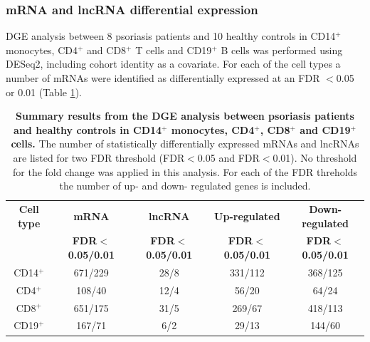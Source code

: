 \subsubsection{mRNA and lncRNA differential expression}

DGE analysis between 8 psoriasis patients and 10 healthy controls in CD14$^+$ monocytes, CD4$^+$ and CD8$^+$ T cells and CD19$^+$ B cells was performed using DESeq2, including cohort identity as a covariate. For each of the cell types a number of mRNAs were identified as differentially expressed at an FDR $<$0.05 or 0.01 (Table \ref{tab:RNAseq_PS_CTL_differential_analysis_results}).  

\begin{table}[htbp]
\centering
\begin{tabular}{@{} c c c c c}
\toprule
\textbf{Cell type}   & \textbf{mRNA}            & \textbf{lncRNA}           & \textbf{Up-regulated}        & \textbf{Down-regulated}\\
                     & \textbf{FDR$<$0.05/0.01} & \textbf{FDR$<$0.05/0.01}  & \textbf{FDR$<$0.05/0.01}    & \textbf{FDR$<$0.05/0.01}\\
	
										
\midrule
\midrule
CD14$^+$             & 671/229                  & 28/8                    & 331/112                       &368/125\\               
CD4$^+$              & 108/40                   & 12/4                    & 56/20                         &64/24 \\
CD8$^+$              & 651/175                  & 31/5                    & 269/67                        &418/113 \\
CD19$^+$             & 167/71                   & 6/2                     & 29/13                         &144/60\\
\bottomrule 
\end{tabular}
\medskip %
\caption[Summary results from the DGE analysis between psoriasis patients and healthy controls in CD14$^+$ monocytes, CD4$^+$, CD8$^+$ and CD19$^+$ cells.]{\textbf{Summary results from the DGE analysis between psoriasis patients and healthy controls in CD14$^+$ monocytes, CD4$^+$, CD8$^+$ and CD19$^+$ cells.} The number of statistically differentially expressed mRNAs and lncRNAs are listed for two FDR threshold (FDR$<$0.05 and FDR$<$0.01). No threshold for the fold change was applied in this analysis. For each of the FDR threholds the number of up- and down- regulated genes is included.}
\label{tab:RNAseq_PS_CTL_differential_analysis_results}
\end{table}
\bigskip %

